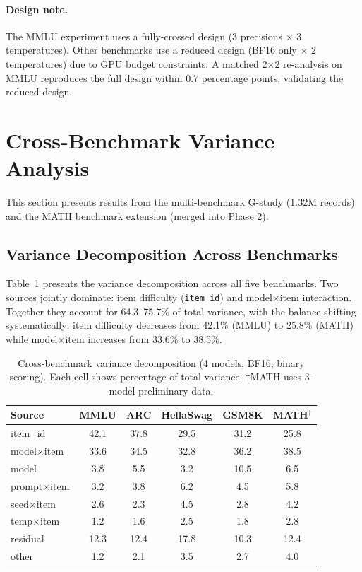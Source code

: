\documentclass[11pt]{article}
\begin{document}
\paragraph{Design note.}
The MMLU experiment uses a fully-crossed design (3 precisions $\times$ 3 temperatures).
Other benchmarks use a reduced design (BF16 only $\times$ 2 temperatures) due to GPU budget constraints.
A matched 2$\times$2 re-analysis on MMLU reproduces the full design within 0.7 percentage points, validating the reduced design.

\section{Cross-Benchmark Variance Analysis}
\label{sec:crossbench}

This section presents results from the multi-benchmark G-study (1.32M records) and the MATH benchmark extension (merged into Phase 2).

\subsection{Variance Decomposition Across Benchmarks}

Table~\ref{tab:cross_decomp} presents the variance decomposition across all five benchmarks.
Two sources jointly dominate: item difficulty (\texttt{item\_id}) and model$\times$item interaction.
Together they account for 64.3--75.7\% of total variance, with the balance shifting systematically: item difficulty decreases from 42.1\% (MMLU) to 25.8\% (MATH) while model$\times$item increases from 33.6\% to 38.5\%.

\begin{table}[t]
\centering
\caption{Cross-benchmark variance decomposition (4 models, BF16, binary scoring). Each cell shows percentage of total variance. $\dagger$MATH uses 3-model preliminary data.}
\label{tab:cross_decomp}
\small
\begin{tabular}{@{}lccccc@{}}
\toprule
Source & MMLU & ARC & HellaSwag & GSM8K & MATH$^\dagger$ \\
\midrule
item\_id         & 42.1 & 37.8 & 29.5 & 31.2 & 25.8 \\
model$\times$item & 33.6 & 34.5 & 32.8 & 36.2 & 38.5 \\
model            &  3.8 &  5.5 &  3.2 & 10.5 &  6.5 \\
prompt$\times$item &  3.2 &  3.8 &  6.2 &  4.5 &  5.8 \\
seed$\times$item   &  2.6 &  2.3 &  4.5 &  2.8 &  4.2 \\
temp$\times$item   &  1.2 &  1.6 &  2.5 &  1.8 &  2.8 \\
residual         & 12.3 & 12.4 & 17.8 & 10.3 & 12.4 \\
other            &  1.2 &  2.1 &  3.5 &  2.7 &  4.0 \\
\bottomrule
\end{tabular}
\end{table}
\end{document}
